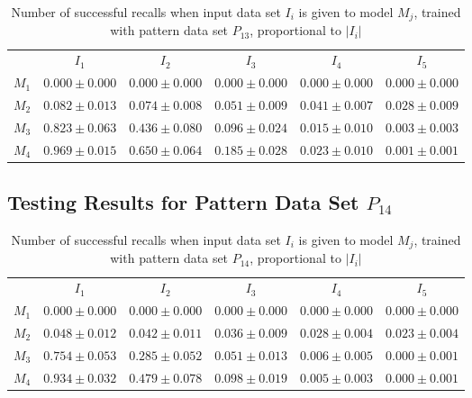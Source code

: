 \documentclass[anon]{CI}
\begin{document}
		\begin{table}[H]
			\centering
			\def\arraystretch{1.5}
			\footnotesize
			\begin{tabular}{cccccc}
				
				& $I_{1}$  & $I_{2}$  & $I_{3}$  & $I_{4}$  & $I_{5}$ \\ \cline{2-6}
				$M_{1}$  & $0.000\pm0.000$  & $0.000\pm0.000$  & $0.000\pm0.000$  & $0.000\pm0.000$  & $0.000\pm0.000$ \\
				$M_{2}$  & $0.082\pm0.013$  & $0.074\pm0.008$  & $0.051\pm0.009$  & $0.041\pm0.007$  & $0.028\pm0.009$ \\
				$M_{3}$  & $0.823\pm0.063$  & $0.436\pm0.080$  & $0.096\pm0.024$  & $0.015\pm0.010$  & $0.003\pm0.003$ \\
				$M_{4}$  & $0.969\pm0.015$  & $0.650\pm0.064$  & $0.185\pm0.028$  & $0.023\pm0.010$  & $0.001\pm0.001$ \\
				
			\end{tabular}
			\caption{Number of successful recalls when input data set $I_i$ is given to model $M_j$, trained with pattern data set $P_{13}$, proportional to $\left|I_i\right|$}
		\end{table}
		
		\subsection{Testing Results for Pattern Data Set $P_{14}$}
		
		
		\begin{table}[H]
			\centering
			\def\arraystretch{1.5}
			\footnotesize
			\begin{tabular}{cccccc}
				
				& $I_{1}$  & $I_{2}$  & $I_{3}$  & $I_{4}$  & $I_{5}$ \\ \cline{2-6}
				$M_{1}$  & $0.000\pm0.000$  & $0.000\pm0.000$  & $0.000\pm0.000$  & $0.000\pm0.000$  & $0.000\pm0.000$ \\
				$M_{2}$  & $0.048\pm0.012$  & $0.042\pm0.011$  & $0.036\pm0.009$  & $0.028\pm0.004$  & $0.023\pm0.004$ \\
				$M_{3}$  & $0.754\pm0.053$  & $0.285\pm0.052$  & $0.051\pm0.013$  & $0.006\pm0.005$  & $0.000\pm0.001$ \\
				$M_{4}$  & $0.934\pm0.032$  & $0.479\pm0.078$  & $0.098\pm0.019$  & $0.005\pm0.003$  & $0.000\pm0.001$ \\
				
			\end{tabular}
			\caption{Number of successful recalls when input data set $I_i$ is given to model $M_j$, trained with pattern data set $P_{14}$, proportional to $\left|I_i\right|$}
		\end{table}
		
\end{document}
